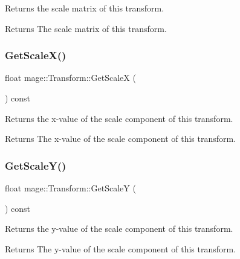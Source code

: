 Returns the scale matrix of this transform.

\begin{DoxyReturn}{Returns}
The scale matrix of this transform. 
\end{DoxyReturn}
\hypertarget{structmage_1_1_transform_a3a82465d40dde6b98ca274a8de061545}{}\label{structmage_1_1_transform_a3a82465d40dde6b98ca274a8de061545} 
\subsubsection{\texorpdfstring{Get\+Scale\+X()}{GetScaleX()}}
{\footnotesize\ttfamily float mage\+::\+Transform\+::\+Get\+ScaleX (\begin{DoxyParamCaption}{ }\end{DoxyParamCaption}) const}

Returns the x-\/value of the scale component of this transform.

\begin{DoxyReturn}{Returns}
The x-\/value of the scale component of this transform. 
\end{DoxyReturn}
\hypertarget{structmage_1_1_transform_acbd677fa7e27cb15d205ac8354d8624a}{}\label{structmage_1_1_transform_acbd677fa7e27cb15d205ac8354d8624a} 
\subsubsection{\texorpdfstring{Get\+Scale\+Y()}{GetScaleY()}}
{\footnotesize\ttfamily float mage\+::\+Transform\+::\+Get\+ScaleY (\begin{DoxyParamCaption}{ }\end{DoxyParamCaption}) const}

Returns the y-\/value of the scale component of this transform.

\begin{DoxyReturn}{Returns}
The y-\/value of the scale component of this transform. 
\end{DoxyReturn}
\hypertarget{structmage_1_1_transform_a9e8f3a4ec330e6f4c9e1a9607daf30fa}{}\label{structmage_1_1_transform_a9e8f3a4ec330e6f4c9e1a9607daf30fa} 
